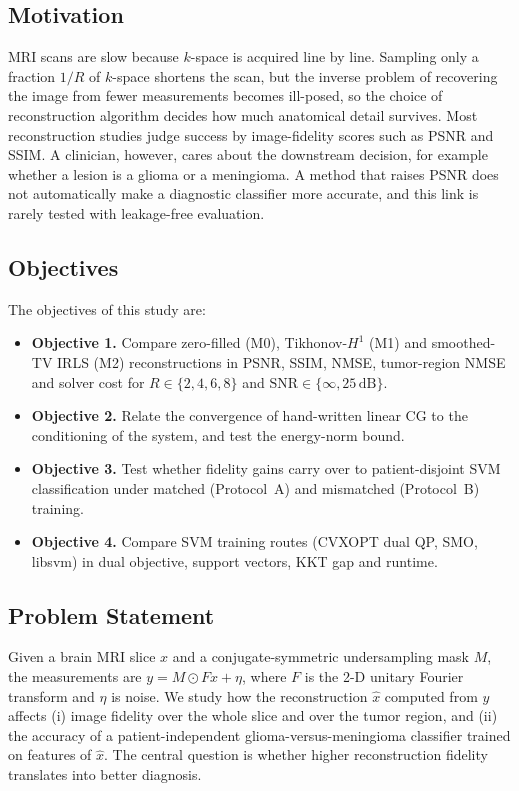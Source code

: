 \documentclass[conference,a4paper]{IEEEtran}
\begin{document}
\subsection{Motivation}
MRI scans are slow because $k$-space is acquired line by line. Sampling only a fraction $1/R$ of $k$-space shortens the scan, but the inverse problem of recovering the image from fewer measurements becomes ill-posed, so the choice of reconstruction algorithm decides how much anatomical detail survives. Most reconstruction studies judge success by image-fidelity scores such as PSNR and SSIM. A clinician, however, cares about the downstream decision, for example whether a lesion is a glioma or a meningioma. A method that raises PSNR does not automatically make a diagnostic classifier more accurate, and this link is rarely tested with leakage-free evaluation.

\subsection{Objectives}
The objectives of this study are:
\begin{itemize}[leftmargin=1.1em,itemsep=1pt,topsep=2pt]
\item \textbf{Objective 1.} Compare zero-filled (M0), Tikhonov-$H^1$ (M1) and smoothed-TV IRLS (M2) reconstructions in PSNR, SSIM, NMSE, tumor-region NMSE and solver cost for $R\in\{2,4,6,8\}$ and $\mathrm{SNR}\in\{\infty,25\,\mathrm{dB}\}$.
\item \textbf{Objective 2.} Relate the convergence of hand-written linear CG to the conditioning of the system, and test the energy-norm bound.
\item \textbf{Objective 3.} Test whether fidelity gains carry over to patient-disjoint SVM classification under matched (Protocol~A) and mismatched (Protocol~B) training.
\item \textbf{Objective 4.} Compare SVM training routes (CVXOPT dual QP, SMO, libsvm) in dual objective, support vectors, KKT gap and runtime.
\end{itemize}

\subsection{Problem Statement}
Given a brain MRI slice $x$ and a conjugate-symmetric undersampling mask $M$, the measurements are $y=M\odot Fx+\eta$, where $F$ is the 2-D unitary Fourier transform and $\eta$ is noise. We study how the reconstruction $\hat{x}$ computed from $y$ affects (i) image fidelity over the whole slice and over the tumor region, and (ii) the accuracy of a patient-independent glioma-versus-meningioma classifier trained on features of $\hat{x}$. The central question is whether higher reconstruction fidelity translates into better diagnosis.
\end{document}
